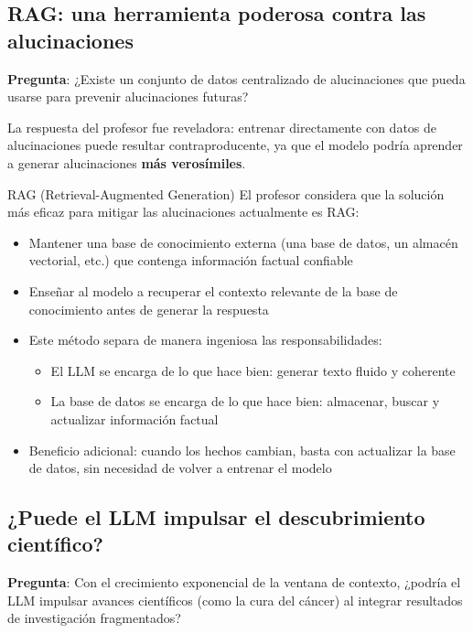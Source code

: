 \documentclass[a4paper]{article}
\begin{document}
\subsection{RAG: una herramienta poderosa contra las alucinaciones}

\textbf{Pregunta}: ¿Existe un conjunto de datos centralizado de alucinaciones que pueda usarse para prevenir alucinaciones futuras?

La respuesta del profesor fue reveladora: entrenar directamente con datos de alucinaciones puede resultar contraproducente, ya que el modelo podría aprender a generar alucinaciones \textbf{más verosímiles}.

\begin{importantbox}{RAG (Retrieval-Augmented Generation)}
El profesor considera que la solución más eficaz para mitigar las alucinaciones actualmente es RAG:
\begin{itemize}
    \item Mantener una base de conocimiento externa (una base de datos, un almacén vectorial, etc.) que contenga información factual confiable
    \item Enseñar al modelo a recuperar el contexto relevante de la base de conocimiento antes de generar la respuesta
    \item Este método separa de manera ingeniosa las responsabilidades:
    \begin{itemize}
        \item El LLM se encarga de lo que hace bien: generar texto fluido y coherente
        \item La base de datos se encarga de lo que hace bien: almacenar, buscar y actualizar información factual
    \end{itemize}
    \item Beneficio adicional: cuando los hechos cambian, basta con actualizar la base de datos, sin necesidad de volver a entrenar el modelo
\end{itemize}
\end{importantbox}

\subsection{¿Puede el LLM impulsar el descubrimiento científico?}

\textbf{Pregunta}: Con el crecimiento exponencial de la ventana de contexto, ¿podría el LLM impulsar avances científicos (como la cura del cáncer) al integrar resultados de investigación fragmentados?
\end{document}
